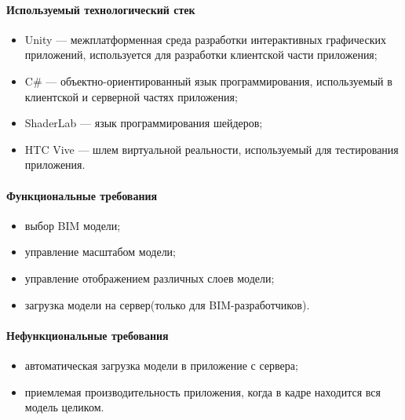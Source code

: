 \paragraph{Используемый технологический стек}
\begin{itemize}
    \item Unity — межплатформенная среда разработки интерактивных графических приложений, используется для разработки клиентской части приложения;
    \item C\# — объектно-ориентированный язык программирования, используемый в клиентской и серверной частях приложения;
    \item ShaderLab — язык программирования шейдеров;
    \item HTC Vive — шлем виртуальной реальности, используемый для тестирования приложения.
\end{itemize}

\paragraph{Функциональные требования}
\begin{itemize}
    \item выбор BIM модели;
    \item управление масштабом модели;
    \item управление отображением различных слоев модели;
    \item загрузка модели на сервер(только для BIM-разработчиков).
\end{itemize}

\paragraph{Нефункциональные требования}
\begin{itemize}
    \item автоматическая загрузка модели в приложение с сервера;
    \item  приемлемая производительность приложения, когда в кадре находится вся модель целиком.
\end{itemize}

